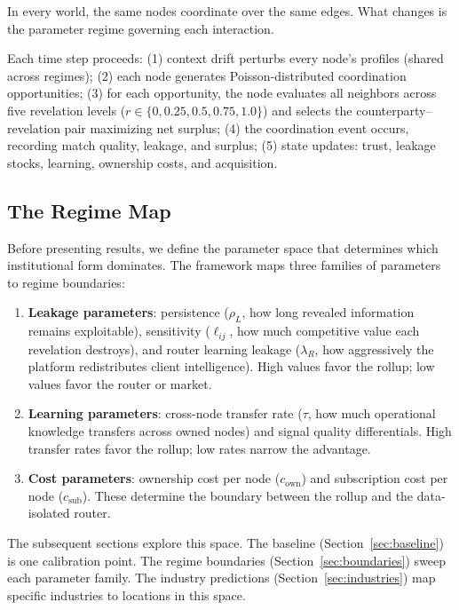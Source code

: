 \documentclass[12pt]{article}
\theoremstyle{definition}
\begin{document}
\noindent In every world, the same nodes coordinate over the same edges. What changes is the parameter regime governing each interaction.

Each time step proceeds: (1) context drift perturbs every node's profiles (shared across regimes); (2) each node generates Poisson-distributed coordination opportunities; (3) for each opportunity, the node evaluates all neighbors across five revelation levels ($r \in \{0, 0.25, 0.5, 0.75, 1.0\}$) and selects the counterparty--revelation pair maximizing net surplus; (4) the coordination event occurs, recording match quality, leakage, and surplus; (5) state updates: trust, leakage stocks, learning, ownership costs, and acquisition.

\subsection{The Regime Map}
\label{sec:regimemap}

Before presenting results, we define the parameter space that determines which institutional form dominates. The framework maps three families of parameters to regime boundaries:

\begin{enumerate}[leftmargin=*]
\item \textbf{Leakage parameters}: persistence ($\rho_L$, how long revealed information remains exploitable), sensitivity ($\ell_{ij}$, how much competitive value each revelation destroys), and router learning leakage ($\lambda_R$, how aggressively the platform redistributes client intelligence). High values favor the rollup; low values favor the router or market.

\item \textbf{Learning parameters}: cross-node transfer rate ($\tau$, how much operational knowledge transfers across owned nodes) and signal quality differentials. High transfer rates favor the rollup; low rates narrow the advantage.

\item \textbf{Cost parameters}: ownership cost per node ($c_{\text{own}}$) and subscription cost per node ($c_{\text{sub}}$). These determine the boundary between the rollup and the data-isolated router.
\end{enumerate}

\noindent The subsequent sections explore this space. The baseline (Section~\ref{sec:baseline}) is one calibration point. The regime boundaries (Section~\ref{sec:boundaries}) sweep each parameter family. The industry predictions (Section~\ref{sec:industries}) map specific industries to locations in this space.
\end{document}
